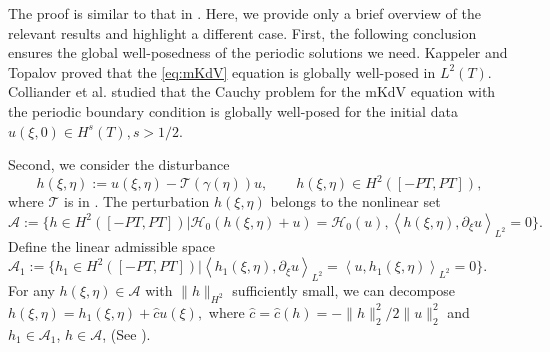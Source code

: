 \documentclass[11pt,reqno]{amsart}
\numberwithin{equation}{section}
\begin{document}
\newenvironment{proof-orbital-cn}{\emph{Proof of \Cref{theorem:orbital-cn}.}}{\hfill$\Box$\medskip}
\begin{proof-orbital-cn}
	The proof is similar to that in \cite{DeconinckyU-20,LingS-23-mKdV-stability}. 
	Here, we provide only a brief overview of the relevant results and highlight a different case. 
	First, the following conclusion ensures the global well-posedness of the periodic solutions we need.
	Kappeler and Topalov \cite{KappelerT-2005} proved that the \ref{eq:mKdV} equation is globally well-posed in $L^2(T)$.
	Colliander et al. \cite{CollianderKSTT-03} studied that the Cauchy problem for the mKdV equation with the periodic boundary condition is globally well-posed for the initial data $u(\xi,0)\in H^{s}(T),s>1/2$. 
		
	Second, we consider the disturbance
	\begin{equation}\label{eq:h-dis}
		h(\xi,\eta):=\hat{u}(\xi,\eta)-\mathcal{T}(\gamma(\eta))u, \qquad h(\xi,\eta)\in H^2([-PT,PT]),
	\end{equation}
	where $\mathcal{T}$ is in . The perturbation $h(\xi,\eta)$ belongs to the nonlinear set $\mathcal{A}:=\{h\in H^2([-PT,PT])|\mathcal{H}_0(h(\xi,\eta)+u)=\mathcal{H}_0(u),\left\langle h(\xi,\eta),\partial_{\xi}u\right \rangle_{L^2}=0\}.$
	Define the linear admissible space 
	$\mathcal{A}_1:=\{h_1\in H^2([-PT,PT])| \left\langle h_1(\xi,\eta),\partial_{\xi}u\right \rangle_{L^2}=\left\langle u,h_1 (\xi,\eta)\right\rangle_{L^2}=0\}$. 
	For any $h(\xi,\eta)\in \mathcal{A}$ with $\|h\|_{H^2}$ sufficiently small, we can decompose $h(\xi,\eta)=h_1(\xi,\eta)+\hat{c}u(\xi),$ where $\hat{c}=\hat{c}(h)=-\|h\|_2^2/2\|u\|_2^2$ and $h_1\in \mathcal{A}_1$, $h\in \mathcal{A}$, (See \cite{LingS-23-mKdV-stability}).
		

\end{proof-orbital-cn}
\end{document}
